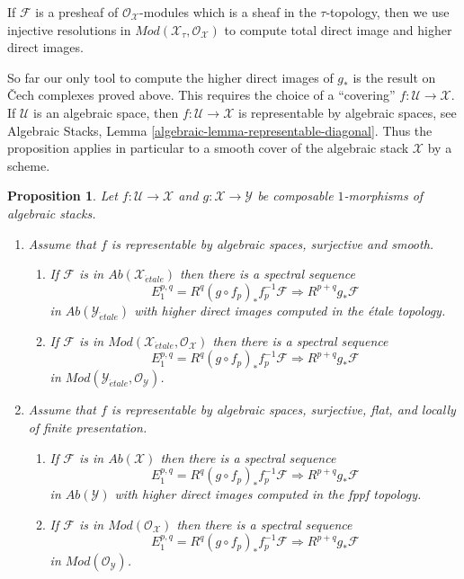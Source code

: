 \documentclass{stacks-project}
\theoremstyle{plain}
\newtheorem{proposition}[subsection]{Proposition}
\theoremstyle{definition}
\theoremstyle{remark}
\numberwithin{equation}{subsection}
\def\etale{{\acute{e}tale}}
\begin{document}
\medskip\noindent
If $\mathcal{F}$ is a presheaf of $\mathcal{O}_\mathcal{X}$-modules
which is a sheaf in the $\tau$-topology, then we use injective
resolutions in $\textit{Mod}(\mathcal{X}_\tau, \mathcal{O}_\mathcal{X})$
to compute total direct image and higher direct images.

\medskip\noindent
So far our only tool to compute the higher direct images of $g_*$
is the result on {\v C}ech complexes proved above. This requires the choice
of a ``covering'' $f : \mathcal{U} \to \mathcal{X}$. If $\mathcal{U}$
is an algebraic space, then $f : \mathcal{U} \to \mathcal{X}$
is representable by algebraic spaces, see
Algebraic Stacks, Lemma \ref{algebraic-lemma-representable-diagonal}.
Thus the proposition applies in particular to a smooth cover of the
algebraic stack $\mathcal{X}$ by a scheme.

\begin{proposition}
\label{proposition-smooth-covering-compute-direct-image}
Let $f : \mathcal{U} \to \mathcal{X}$ and $g : \mathcal{X} \to \mathcal{Y}$
be composable $1$-morphisms of algebraic stacks.
\begin{enumerate}
\item Assume that $f$ is representable by algebraic spaces, surjective and
smooth.
\begin{enumerate}
\item If $\mathcal{F}$ is in $\textit{Ab}(\mathcal{X}_\etale)$
then there is a spectral sequence
$$
E_1^{p, q} = R^q(g \circ f_p)_*f_p^{-1}\mathcal{F}
\Rightarrow
R^{p + q}g_*\mathcal{F}
$$
in $\textit{Ab}(\mathcal{Y}_\etale)$ with higher direct images
computed in the \'etale topology.
\item If $\mathcal{F}$ is in
$\textit{Mod}(\mathcal{X}_\etale, \mathcal{O}_\mathcal{X})$ then
there is a spectral sequence
$$
E_1^{p, q} = R^q(g \circ f_p)_*f_p^{-1}\mathcal{F}
\Rightarrow
R^{p + q}g_*\mathcal{F}
$$
in $\textit{Mod}(\mathcal{Y}_\etale, \mathcal{O}_\mathcal{Y})$.
\end{enumerate}
\item Assume that $f$ is representable by algebraic spaces, surjective,
flat, and locally of finite presentation.
\begin{enumerate}
\item If $\mathcal{F}$ is in $\textit{Ab}(\mathcal{X})$ then there is
a spectral sequence
$$
E_1^{p, q} = R^q(g \circ f_p)_*f_p^{-1}\mathcal{F}
\Rightarrow
R^{p + q}g_*\mathcal{F}
$$
in $\textit{Ab}(\mathcal{Y})$ with higher direct images
computed in the fppf topology.
\item If $\mathcal{F}$ is in $\textit{Mod}(\mathcal{O}_\mathcal{X})$ then
there is a spectral sequence
$$
E_1^{p, q} = R^q(g \circ f_p)_*f_p^{-1}\mathcal{F}
\Rightarrow
R^{p + q}g_*\mathcal{F}
$$
in $\textit{Mod}(\mathcal{O}_\mathcal{Y})$.
\end{enumerate}
\end{enumerate}
\end{proposition}
\end{document}
